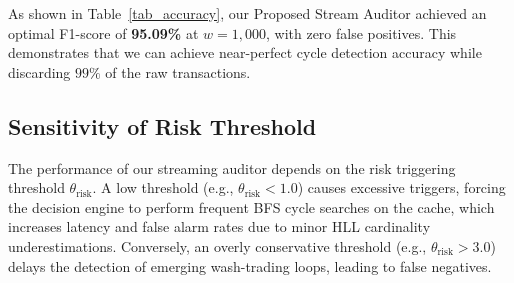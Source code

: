 \documentclass[conference]{IEEEtran}
\begin{document}
\begin{table}[htbp]
\caption{Classification Accuracy vs. Sketch Width $w$}
\label{tab_accuracy}
\centering
{}
\end{table}

As shown in Table~\ref{tab_accuracy}, our Proposed Stream Auditor achieved an optimal F1-score of \textbf{95.09\%} at $w = 1,000$, with zero false positives. This demonstrates that we can achieve near-perfect cycle detection accuracy while discarding $99\%$ of the raw transactions.

\subsection{Sensitivity of Risk Threshold}
The performance of our streaming auditor depends on the risk triggering threshold $\theta_{\text{risk}}$. A low threshold (e.g., $\theta_{\text{risk}} < 1.0$) causes excessive triggers, forcing the decision engine to perform frequent BFS cycle searches on the cache, which increases latency and false alarm rates due to minor HLL cardinality underestimations. Conversely, an overly conservative threshold (e.g., $\theta_{\text{risk}} > 3.0$) delays the detection of emerging wash-trading loops, leading to false negatives. 
\end{document}
